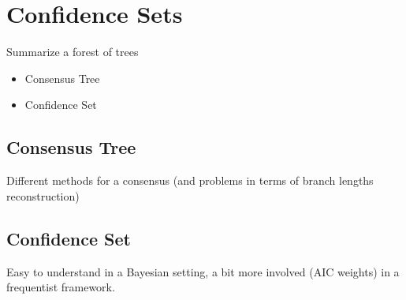 \section{Confidence Sets} \label{sec:confidence}

Summarize a forest of trees
\begin{itemize}
 \item Consensus Tree
 \item Confidence Set
\end{itemize}

\subsection{Consensus Tree} \label{sec:consensus-tree}

Different methods for a consensus (and problems in terms of branch lengths reconstruction)

\subsection{Confidence Set} \label{sec:confidence-sets}

Easy to understand in a Bayesian setting, a bit more involved (AIC weights) in a frequentist framework. 
